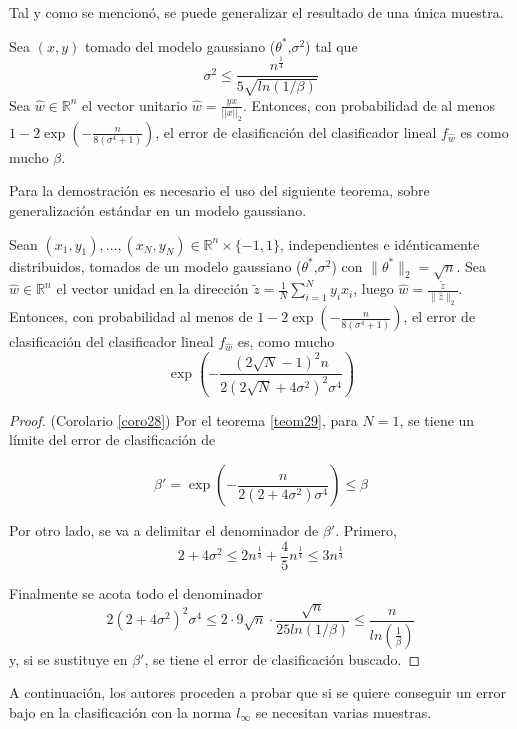 Tal y como se mencionó, se puede generalizar el resultado de una única muestra.

\begin{corolario} \label{coro28}
Sea $(x,y)$ tomado del modelo gaussiano ($\theta^* \text{,}\sigma^2$) tal que 
$$\sigma^2 \leq \frac{n^{\frac{1}{4}}}{5 \sqrt{ln(1/\beta)}}$$
Sea $\hat{w} \in \mathbb{R}^n$ el vector unitario $\hat{w}=\frac{y x}{||x||_2}$. Entonces, con probabilidad de al menos $1-2 \exp \left( -\frac{n}{8(\sigma^4 + 1)} \right)$, el error de clasificación del clasificador lineal $f_{\hat{w}}$ es como mucho $\beta$.
\end{corolario}

Para la demostración es necesario el uso del siguiente teorema, sobre generalización estándar en un modelo gaussiano.

\begin{teorema} \label{teom29}
Sean $(x_1,y_1),\ldots,(x_N,y_N) \in \mathbb{R}^n \times \{-1,1\}$, independientes e idénticamente distribuidos, tomados de un modelo gaussiano ($\theta^* \text{,}\sigma^2$) con $\|\theta^* \|_2=\sqrt{n}$. Sea $\hat{w}\in\mathbb{R}^n$ el vector unidad en la dirección $\tilde{z}=\frac{1}{N} \sum_{i=1}^N y_i x_i$, luego $\hat{w}=\frac{\tilde{z}}{\|\hat{z} \|_2}$. Entonces, con probabilidad al menos de $1-2 \exp(-\frac{n}{8(\sigma^4 + 1)})$, el error de clasificación del clasificador lineal $f_{\hat{w}}$ es, como mucho
$$\exp \left( -\frac{(2 \sqrt{N}-1)^2 n}{2(2 \sqrt{N} + 4\sigma^2)^2\sigma^4} \right)$$
\end{teorema}

\begin{proof} (Corolario \ref{coro28})
Por el teorema \ref{teom29}, para $N=1$, se tiene un límite del error de clasificación de 

$$\beta' = \exp \left( - \frac{n}{2(2+4\sigma^2)\sigma^4} \right) \leq \beta$$

Por otro lado, se va a delimitar el denominador de $\beta'$. Primero,
$$2 + 4 \sigma^2 \leq 2 n^{\frac{1}{4}}+\frac{4}{5} n^{\frac{1}{4}} \leq 3 n^{\frac{1}{4}}$$

Finalmente se acota todo el denominador
$$2(2+4 \sigma^2)^2 \sigma^4 \leq 2 \cdot 9 \sqrt{n} \cdot \frac{\sqrt{n}}{25 ln(1/\beta)} \leq \frac{n}{ln \left( \frac{1}{\beta} \right)}$$
y, si se sustituye en $\beta'$, se tiene el error de clasificación buscado.
\end{proof}

A continuación, los autores proceden a probar que si se quiere conseguir un error bajo en la clasificación con la norma $l_{\infty}$ se necesitan varias muestras.

